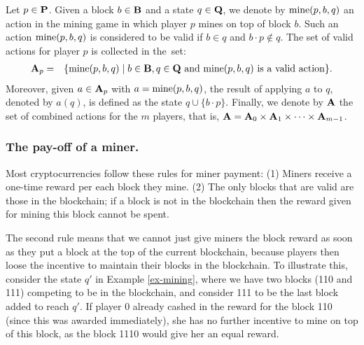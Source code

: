 Let $p \in \mathbf{P}$. Given a block $b \in \mathbf{B}$ and a state $q \in \mathbf{Q}$, we denote by $\text{\rm mine}(p,b,q)$ an action in the mining game in which player $p$ mines on top of block $b$. Such an action $\text{\rm mine}(p,b,q)$ is considered to be valid if $b \in q$ and $b\cdot p \not\in q$. The set of valid actions for player $p$ is collected in the~set:
\begin{eqnarray*}
\mathbf{A}_p & = & \{ \text{\rm mine}(p,b,q) \mid b \in \mathbf{B}, q \in \mathbf{Q} \text{ and } \text{\rm mine}(p,b,q) \text{ is a valid action}\}.
\end{eqnarray*}
Moreover, given $a \in \mathbf{A}_p$ with $a = \text{\rm mine}(p,b,q)$, the result of applying $a$ to $q$, denoted by $a(q)$, is defined as the state $q \cup \{b \cdot p\}$. Finally, we denote by $\mathbf{A}$ the set of combined actions for the $m$ players, that is, $\mathbf{A} = \mathbf{A}_0 \times \mathbf{A}_1 \times \cdots \times \mathbf{A}_{m-1}$.

\subsubsection{The pay-off of a miner.}
Most cryptocurrencies follow these rules for miner payment:
%
(1) Miners receive a one-time reward per each block they mine. %
%
(2) The only blocks that are valid are those in the blockchain; if a block is not in the blockchain then the reward given for mining this block cannot be spent. 

The second rule means that we cannot just give miners the block reward as soon as they put a block at the top of the current blockchain, because players then loose the incentive 
to maintain their blocks in the blockchain. To illustrate this, consider the state $q'$ in Example \ref{ex-mining}, where we have two blocks (110 and 111) competing to be in the blockchain, and consider 111 to be the last block added to reach $q'$. If player 0 already cashed in the reward for the block 110 (since this was awarded immediately), she has no further incentive to mine on top of this block, as the block 1110 would give her an equal reward. 


